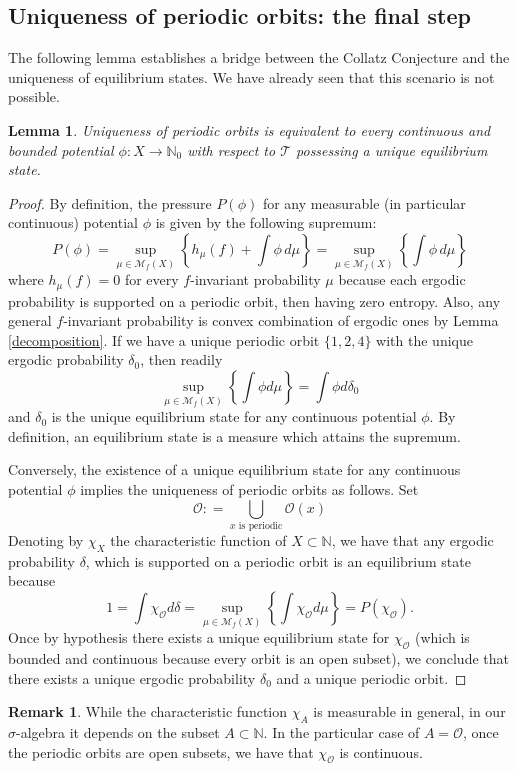 \documentclass[12 pt]{amsart}
\newtheorem{lemma}[theorem]{Lemma}
\theoremstyle{definition}
\newtheorem{remark}[theorem]{Remark}
\begin{document}
	
	

	
	\subsection{Uniqueness of periodic orbits: the final step}
	The following lemma establishes a bridge between the Collatz Conjecture and the uniqueness of equilibrium states. We have already seen that this scenario is not possible.
	\begin{lemma}\label{uniqueness}
		Uniqueness of periodic orbits is equivalent to every continuous and bounded potential $\phi : X \to \mathbb{N}_{0}$ with respect to $\mathcal{T}$ possessing a unique equilibrium state.
	\end{lemma}
	\begin{proof}
		By definition, the pressure $P(\phi)$ for any measurable (in particular continuous) potential $\phi$ is given by the following supremum:
		\begin{equation}
			P(\phi) = \sup_{\mu \in \mathcal{M}_{f}(X)} \left\{ h_\mu(f) + \int \phi \, d\mu \right\} = \sup_{\mu \in \mathcal{M}_{f}(X)} \left\{ \int \phi \, d\mu \right\}
		\end{equation}
		where $h_{\mu}(f) = 0$ for every $f$-invariant probability $\mu$ because each ergodic probability is supported on a periodic orbit, then having zero entropy. Also, any general $f$-invariant probability is convex combination of ergodic ones by Lemma \ref{decomposition}. If we have a unique periodic orbit $\{1, 2, 4\}$ with the unique ergodic probability $\delta_{0}$, then readily
		\[
		\sup_{\mu \in \mathcal{M}_{f}(X)} \left\{ \int \phi  d\mu \right\} = \int \phi d\delta_{0}
		\]
		and $\delta_{0}$ is the unique equilibrium state for any continuous potential $\phi$. By definition, an equilibrium state is a measure which attains the supremum.
		
		Conversely, the existence of a unique equilibrium state for any continuous potential $\phi$ implies the uniqueness of periodic orbits as follows. Set
		\[
		\mathcal{O}: = \bigcup_{x \,\, \text{is periodic}}\mathcal{O}(x)
		\]
		Denoting by $\chi_{X}$ the characteristic function of $X \subset \mathbb{N}$, we have that any ergodic probability $\delta$, which is supported on a periodic orbit is an equilibrium state because
		\[
		1 = \int \chi_{\mathcal{O}} d\delta = \sup_{\mu \in \mathcal{M}_{f}(X)} \left\{ \int \chi_{\mathcal{O}}  d\mu \right\} = P(\chi_{\mathcal{O}}).
		\]
		Once by hypothesis there exists a unique equilibrium state for $\chi_{\mathcal{O}}$ (which is bounded and continuous because every orbit is an open subset), we conclude that there exists a unique ergodic probability $\delta_{0}$ and a unique periodic orbit.
	\end{proof}
	\begin{remark}
		While the characteristic function $\chi_{A}$ is measurable in general, in our $\sigma$-algebra it depends on the subset $A \subset \mathbb{N}$. In the particular case of $A = \mathcal{O}$, once the periodic orbits are open subsets, we have that $\chi_{\mathcal{O}}$ is continuous.
	\end{remark}
	
\end{document}
